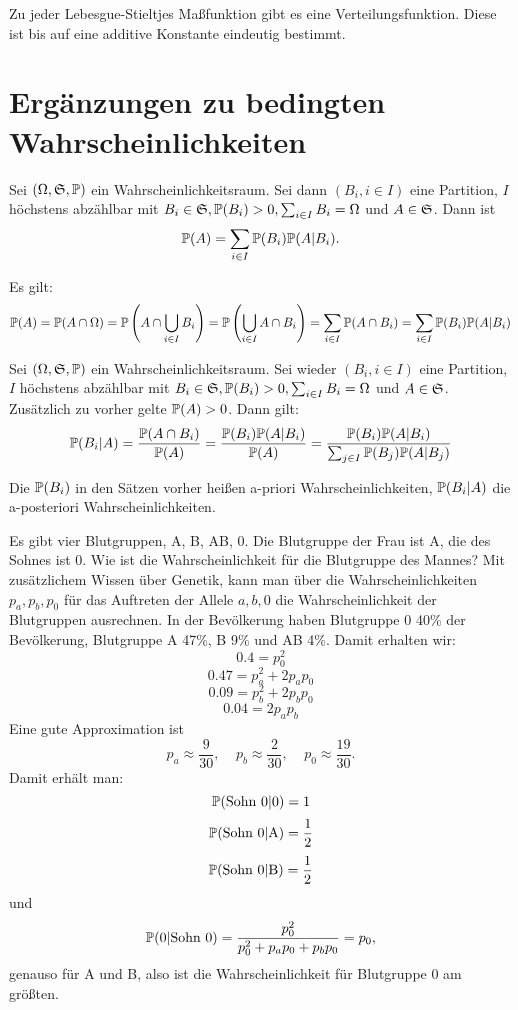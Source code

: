 			\begin{satz}
				Zu jeder Lebesgue-Stieltjes Maßfunktion gibt es eine Verteilungsfunktion. Diese ist bis auf eine additive Konstante eindeutig bestimmt. 
			\end{satz}
			
		\section{Ergänzungen zu bedingten Wahrscheinlichkeiten}
			\begin{satz}
				Sei $(\Omega, \mf{S}, \P)$ ein Wahrscheinlichkeitsraum.
				Sei dann $(B_i, i\in I)$ eine Partition, $I$ höchstens abzählbar mit $B_i\in\mf{S}, \P(B_i)>0, \sum_{i\in I}B_i=\Omega$ und $A\in\mf{S}$. Dann ist
				\[ \P(A)=\sum_{i\in I} \P(B_i)\P(A|B_i). \]
			\end{satz}
			
			\begin{bew}
				Es gilt:
				\[ \P(A)=\P(A\cap \Omega)=\P\left( A\cap\bigcup_{i\in I}B_i\right)=\P\left(\bigcup_{i\in I} A\cap B_i\right)=\sum_{i\in I} \P(A\cap B_i)=\sum_{i\in I} \P(B_i)\P(A|B_i) \]
			\end{bew}
			
			\begin{satz}
				Sei $(\Omega, \mf{S}, \P)$ ein Wahrscheinlichkeitsraum.
				Sei wieder $(B_i, i\in I)$ eine Partition, $I$ höchstens abzählbar mit $B_i\in\mf{S}, \P(B_i)>0, \sum_{i\in I}B_i=\Omega$ und $A\in\mf{S}$. Zusätzlich zu vorher gelte $\P(A)>0$. Dann gilt:
				\[ \P(B_i|A)=\frac{\P(A\cap B_i)}{\P(A)}=\frac{\P(B_i)\P(A|B_i)}{\P(A)}=\frac{\P(B_i)\P(A|B_i)}{\sum_{j\in I}\P(B_j)\P(A|B_j)} \]
			\end{satz}
			
			\begin{defi}
				Die $\P(B_i)$ in den Sätzen vorher heißen a-priori Wahrscheinlichkeiten, $\P(B_i|A)$ die a-posteriori Wahrscheinlichkeiten. 
			\end{defi}
			
			\begin{bsp}
				Es gibt vier Blutgruppen, A, B, AB, 0. Die Blutgruppe der Frau ist A, die des Sohnes ist 0. Wie ist die Wahrscheinlichkeit für die Blutgruppe des Mannes?\newline
				Mit zusätzlichem Wissen über Genetik, kann man über die Wahrscheinlichkeiten $p_a,p_b,p_0$ für das Auftreten der Allele $a,b,0$ die Wahrscheinlichkeit der Blutgruppen ausrechnen. In der Bevölkerung haben Blutgruppe 0 40\% der Bevölkerung, Blutgruppe A 47\%, B 9\% und AB 4\%. Damit erhalten wir:
				\[ 0.4=p_0^2 \]
				\[ 0.47=p_a^2+2p_ap_0 \]
				\[ 0.09=p_b^2+2p_bp_0 \]
				\[ 0.04=2p_ap_b \]
				Eine gute Approximation ist
				\[ p_a\approx \frac{9}{30}, \:\:\:\:\:p_b\approx \frac{2}{30}, \:\:\:\:\: p_0\approx\frac{19}{30}. \]
				Damit erhält man:
				\[ \P(\text{Sohn 0|0})=1 \]
				\[ \P(\text{Sohn 0|A})=\frac{1}{2} \]
				\[ \P(\text{Sohn 0|B})=\frac{1}{2} \]
				und 
				\[ \P(\text{0|Sohn 0})=\frac{p_0^2}{p_0^2+p_ap_0+p_bp_0}=p_0, \]
				genauso für A und B, also ist die Wahrscheinlichkeit für Blutgruppe 0 am größten. 
			\end{bsp}
			
